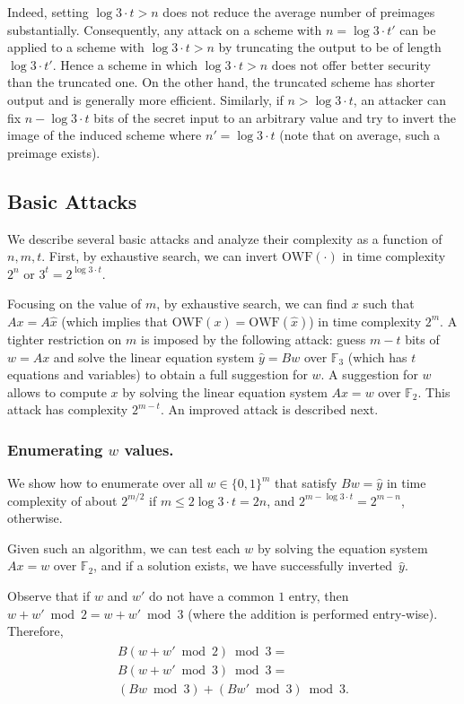 \documentclass[orivec,envcountsect]{llncs}
\newcommand{\OWF}{\text{OWF}}
\begin{document}
Indeed, setting $\log 3 \cdot t > n$ does not reduce the average number of preimages substantially. Consequently, any attack on a scheme with $n = \log 3 \cdot t'$ can be applied to a scheme with $\log 3 \cdot t > n$ by truncating the output to be of length $\log 3 \cdot t'$. Hence a scheme in which $\log 3 \cdot t > n$ does not offer better security than the truncated one.
On the other hand, the truncated scheme has shorter output and is generally more efficient.
Similarly, if $n > \log 3 \cdot t$, an attacker can fix $n - \log 3 \cdot t$ bits of the secret input to an arbitrary value and try to invert the image of the induced scheme where $n' = \log 3 \cdot t$ (note that on average, such a preimage exists).


\subsection{Basic Attacks}
\label{sec:basic}

We describe several basic attacks and analyze their complexity as a function of $n,m,t$.
First, by exhaustive search, we can invert $\OWF(\cdot)$ in time complexity $2^n$ or $3^t = 2^{\log 3 \cdot t}$.

Focusing on the value of $m$, by exhaustive search, we can find $x$ such that $Ax = A\hat{x}$ (which implies that $\OWF(x) = \OWF(\hat{x})$) in time complexity $2^m$.
A tighter restriction on $m$ is imposed by the following attack: guess $m - t$ bits of $w = Ax$ and solve the linear equation system $\hat{y} = Bw$ over $\mathbb{F}_3$ (which has $t$ equations and variables) to obtain a full suggestion for $w$. A suggestion for $w$ allows to compute $x$ by solving the linear equation system $Ax=w$ over $\mathbb{F}_2$. This attack has complexity $2^{m-t}$. An improved attack is described next.

\subsubsection{Enumerating $w$ values.}

We show how to enumerate over all $w \in \{0,1\}^m$ that satisfy $B w = \hat{y}$ in time complexity of about $2^{m/2}$ if $m \leq 2 \log 3 \cdot t = 2 n$, and $2^{m - \log 3 \cdot t} = 2^{m - n}$, otherwise.

Given such an algorithm, we can test each $w$ by solving the equation system $Ax = w$ over $\mathbb{F}_2$, and if a solution exists, we have successfully inverted~$\hat{y}$.

Observe that if $w$ and $w'$ do not have a common $1$ entry, then $w + w' \bmod 2 = w + w' \bmod 3$
(where the addition is performed entry-wise). Therefore,
\begin{align}
\label{eq:lineara}
\begin{split}
B(w + w' \bmod 2) \bmod 3 = \\
B(w + w' \bmod 3) \bmod 3 = \\
(Bw \bmod 3) + (Bw' \bmod 3) \bmod 3.
\end{split}
\end{align}
\end{document}
